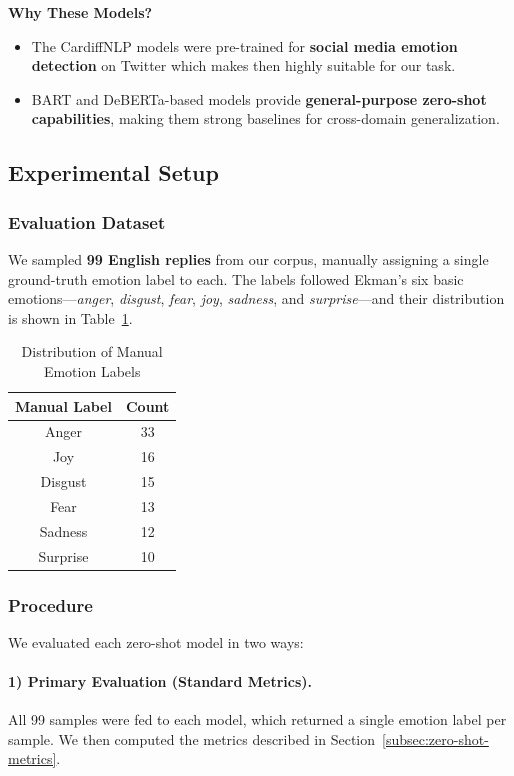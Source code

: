 \noindent \textbf{Why These Models?}
\begin{itemize}
    \item The CardiffNLP models were pre-trained for \textbf{social media emotion detection} on Twitter which makes then highly suitable for our task.
    \item BART and DeBERTa-based models provide \textbf{general-purpose zero-shot capabilities}, making them strong baselines for cross-domain generalization.
\end{itemize}

\subsection{Experimental Setup}

\subsubsection{Evaluation Dataset}
We sampled \textbf{99 English replies} from our corpus, manually assigning a single ground-truth emotion label to each. The labels followed Ekman’s six basic emotions—\textit{anger}, \textit{disgust}, \textit{fear}, \textit{joy}, \textit{sadness}, and \textit{surprise}—and their distribution is shown in Table~\ref{tab:manual_label_distribution}.

\begin{table}[h]
    \centering
    \begin{tabular}{|c|c|}
        \hline
        \textbf{Manual Label} & \textbf{Count} \\
        \hline
        Anger     & 33 \\
        Joy       & 16 \\
        Disgust   & 15 \\
        Fear      & 13 \\
        Sadness   & 12 \\
        Surprise  & 10 \\
        \hline
    \end{tabular}
    \caption{Distribution of Manual Emotion Labels}
    \label{tab:manual_label_distribution}
\end{table}

\subsubsection{Procedure}
We evaluated each zero-shot model in two ways:

\paragraph{1) Primary Evaluation (Standard Metrics).}
All 99 samples were fed to each model, which returned a single emotion label per sample. We then computed the metrics described in Section~\ref{subsec:zero-shot-metrics}.

